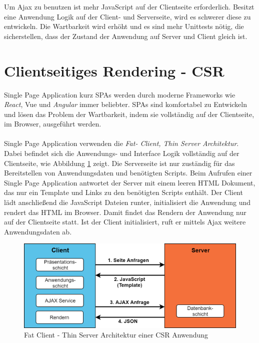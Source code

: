 \documentclass[runningheads]{llncs}
\numberwithin{figure}{section}
\begin{document}
Um Ajax zu benutzen ist mehr JavaScript auf der Clientseite erforderlich. 
Besitzt eine Anwendung Logik auf der Client- und Serverseite, 
wird es schwerer diese zu entwickeln. 
Die Wartbarkeit wird erhöht und es sind mehr Unittests nötig, 
die sicherstellen, dass der Zustand der Anwendung auf Server und 
Client gleich ist. 
\newpage

\section{Clientseitiges Rendering - CSR}
\label{sec:Clientseitiges Rendering}
Single Page Application kurz SPAs werden durch moderne Frameworks wie \textit{React}, 
Vue und \textit{Angular} immer beliebter. SPAs sind komfortabel zu Entwickeln 
und lösen das Problem der Wartbarkeit, 
indem sie vollständig auf der Clientseite, 
im Browser, ausgeführt werden.
\\
\\
Single Page Application verwenden die \textit{Fat- Client, Thin Server Architektur}. 
Dabei befindet sich die Anwendungs- und Interface Logik vollständig auf der Clientseite, wie Abbildung 
\ref{Fat Client - Thin Server Architektur einer CSR Anwendung} zeigt.
Die Serverseite ist nur zuständig für das Bereitstellen von Anwendungsdaten 
und benötigten Scripts. 
Beim Aufrufen einer Single Page Application antwortet der Server 
mit einem leeren HTML Dokument, das nur ein Template und Links 
zu den benötigten Scripts enthält. 
Der Client lädt anschließend die JavaScript Dateien runter, 
initialisiert die Anwendung und rendert das HTML im Browser. 
Damit findet das Rendern der Anwendung nur auf der Clientseite statt. 
Ist der Client initialisiert, ruft er mittels Ajax weitere Anwendungsdaten ab. 
\begin{figure}[h]
  \centering
  \includegraphics[width=12cm]{images/client}
  \caption{Fat Client - Thin Server Architektur einer CSR Anwendung}
  \label{Fat Client - Thin Server Architektur einer CSR Anwendung}
\end{figure}
\end{document}
